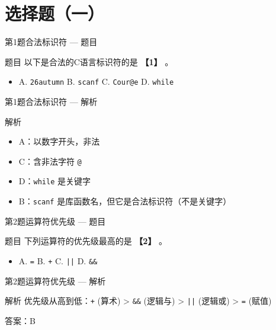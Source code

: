 \section{选择题（一）}

\begin{frame}{第1题}{合法标识符 --- 题目}
    \begin{exampleblock}{题目}
        以下是合法的C语言标识符的是 \textbf{【1】} 。
        \begin{itemize}
            \item A. \texttt{26autumn} \quad B. \texttt{scanf} \quad C. \texttt{Cour@e} \quad D. \texttt{while}
        \end{itemize}
    \end{exampleblock}
\end{frame}

\begin{frame}{第1题}{合法标识符 --- 解析}
    \begin{alertblock}{解析}
        \begin{itemize}
            \item A：以数字开头，非法
            \item C：含非法字符 \texttt{@}
            \item D：\texttt{while} 是关键字
            \item {\color{highlight}B：\texttt{scanf} 是库函数名，但它是合法标识符（不是关键字）}
        \end{itemize}
    \end{alertblock}
\end{frame}

\begin{frame}{第2题}{运算符优先级 --- 题目}
    \begin{exampleblock}{题目}
        下列运算符的优先级最高的是 \textbf{【2】} 。
        \begin{itemize}
            \item A. \texttt{=} \quad B. \texttt{+} \quad C. \texttt{||} \quad D. \texttt{\&\&}
        \end{itemize}
    \end{exampleblock}
\end{frame}

\begin{frame}{第2题}{运算符优先级 --- 解析}
    \begin{alertblock}{解析}
        优先级从高到低：\texttt{+} (算术) > \texttt{\&\&} (逻辑与) > \texttt{||} (逻辑或) > \texttt{=} (赋值)
        \vspace{0.5em}

        {\color{highlight}答案：B}
    \end{alertblock}
\end{frame}

